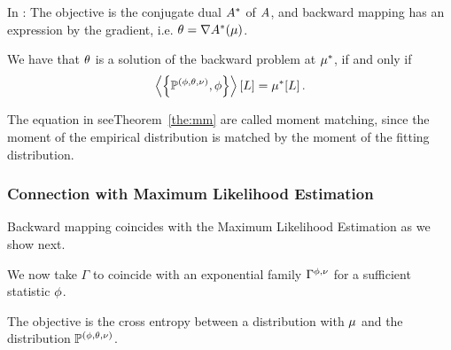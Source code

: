 In \cite{wainwright_graphical_2008}:
 The objective is the conjugate dual $A^*$ of $A$, and backward mapping has an expression by the gradient, i.e. $\theta = \nabla A^*(\mu)$.


\begin{theorem}\label{the:MM}
	We have that $\theta$ is a solution of the backward problem at $\mu^*$, if and only if 
		\[ \left\langle \left\{\mathbb{P}^{(\phi,\theta,\nu)},\phi\right\}\right\rangle \left[ L \right] = \mu^*[L] \, . \]
\end{theorem}

The equation in seeTheorem~\ref{the:mm} are called moment matching, since the moment of the empirical distribution is matched by the moment of the fitting distribution.




\subsubsection{Connection with Maximum Likelihood Estimation}

Backward mapping coincides with the Maximum Likelihood Estimation as we show next.

We now take $\Gamma$ to coincide with an exponential family $\Gamma^{\phi,\nu}$ for a sufficient statistic $\phi$.

The objective is the cross entropy between a distribution with $\mu$ and the distribution $\mathbb{P}^{(\phi,\theta,\nu)}$.


